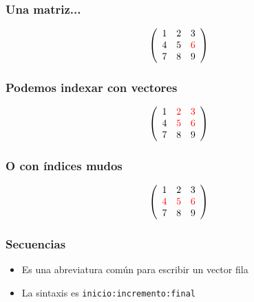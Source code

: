 \documentclass[12pt]{beamer}
\begin{document}
\begin{frame}
\frametitle{Una matriz...}
\[ \left(
\begin{array}{ccc}
1&2&3\\
4&5&\textcolor{red}{6}\\
7&8&9
\end{array} \right)
\]
\testcode
\end{frame}



\begin{frame}
\frametitle{Podemos indexar con vectores}
\[ \left(
\begin{array}{ccc}
1&\textcolor{red}{2}&\textcolor{red}{3}\\
4&\textcolor{red}{5}&\textcolor{red}{6}\\
7&8&9
\end{array} \right)
\]
\testcode
\end{frame}


\begin{frame}
\frametitle{O con índices mudos}
\[ \left(
\begin{array}{ccc}
1&2&3\\
\textcolor{red}{4}&\textcolor{red}{5}&\textcolor{red}{6}\\
7&8&9
\end{array} \right)
\]
\testcode
\end{frame}

\testcode{
\begin{lstlisting}
\end{lstlisting}
}



\begin{frame}
\frametitle{Secuencias}
\begin{itemize}
\item Es una abreviatura común para escribir un vector fila
\item La sintaxis es \texttt{inicio:incremento:final}
\end{itemize}
\testcode
\end{frame}
\end{document}
